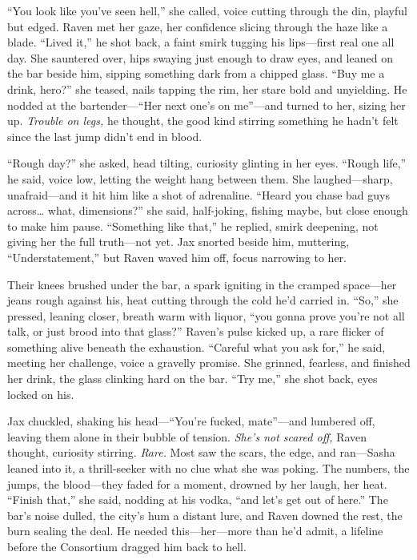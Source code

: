 \documentclass[12pt]{book}
\begin{document}
“You look like you’ve seen hell,” she called, voice cutting through the din, playful but edged. Raven met her gaze, her confidence slicing through the haze like a blade. “Lived it,” he shot back, a faint smirk tugging his lips—first real one all day. She sauntered over, hips swaying just enough to draw eyes, and leaned on the bar beside him, sipping something dark from a chipped glass. “Buy me a drink, hero?” she teased, nails tapping the rim, her stare bold and unyielding. He nodded at the bartender—“Her next one’s on me”—and turned to her, sizing her up. \textit{Trouble on legs,} he thought, the good kind stirring something he hadn’t felt since the last jump didn’t end in blood.

“Rough day?” she asked, head tilting, curiosity glinting in her eyes. “Rough life,” he said, voice low, letting the weight hang between them. She laughed—sharp, unafraid—and it hit him like a shot of adrenaline. “Heard you chase bad guys across… what, dimensions?” she said, half-joking, fishing maybe, but close enough to make him pause. “Something like that,” he replied, smirk deepening, not giving her the full truth—not yet. Jax snorted beside him, muttering, “Understatement,” but Raven waved him off, focus narrowing to her.

Their knees brushed under the bar, a spark igniting in the cramped space—her jeans rough against his, heat cutting through the cold he’d carried in. “So,” she pressed, leaning closer, breath warm with liquor, “you gonna prove you’re not all talk, or just brood into that glass?” Raven’s pulse kicked up, a rare flicker of something alive beneath the exhaustion. “Careful what you ask for,” he said, meeting her challenge, voice a gravelly promise. She grinned, fearless, and finished her drink, the glass clinking hard on the bar. “Try me,” she shot back, eyes locked on his.

Jax chuckled, shaking his head—“You’re fucked, mate”—and lumbered off, leaving them alone in their bubble of tension. \textit{She’s not scared off,} Raven thought, curiosity stirring. \textit{Rare.} Most saw the scars, the edge, and ran—Sasha leaned into it, a thrill-seeker with no clue what she was poking. The numbers, the jumps, the blood—they faded for a moment, drowned by her laugh, her heat. “Finish that,” she said, nodding at his vodka, “and let’s get out of here.” The bar’s noise dulled, the city’s hum a distant lure, and Raven downed the rest, the burn sealing the deal. He needed this—her—more than he’d admit, a lifeline before the Consortium dragged him back to hell.
\end{document}
